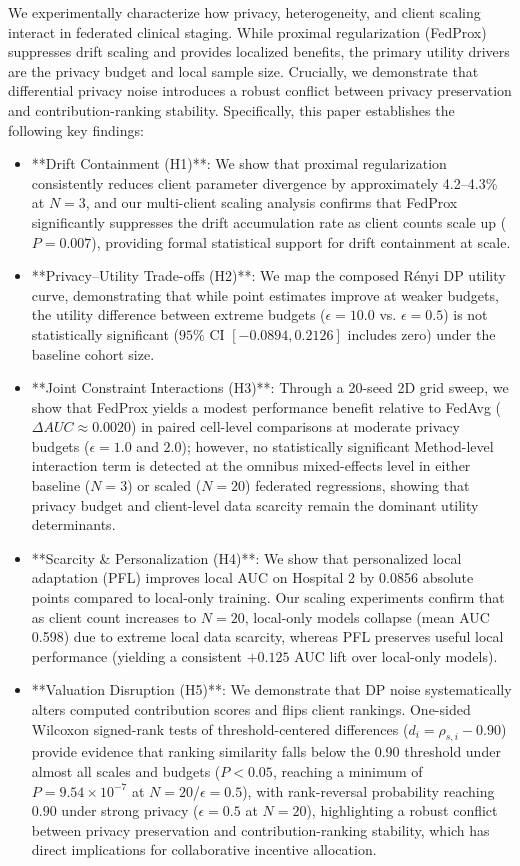 \documentclass[conference]{IEEEtran}
\begin{document}
We experimentally characterize how privacy, heterogeneity, and client scaling interact in federated clinical staging. While proximal regularization (FedProx) suppresses drift scaling and provides localized benefits, the primary utility drivers are the privacy budget and local sample size. Crucially, we demonstrate that differential privacy noise introduces a robust conflict between privacy preservation and contribution-ranking stability. Specifically, this paper establishes the following key findings:
\begin{itemize}
    \item **Drift Containment (H1)**: We show that proximal regularization consistently reduces client parameter divergence by approximately 4.2--4.3\% at $N=3$, and our multi-client scaling analysis confirms that FedProx significantly suppresses the drift accumulation rate as client counts scale up ($P=0.007$), providing formal statistical support for drift containment at scale.
    \item **Privacy--Utility Trade-offs (H2)**: We map the composed Rényi DP utility curve, demonstrating that while point estimates improve at weaker budgets, the utility difference between extreme budgets ($\epsilon=10.0$ vs. $\epsilon=0.5$) is not statistically significant ($95\%$ CI $[-0.0894, 0.2126]$ includes zero) under the baseline cohort size.
    \item **Joint Constraint Interactions (H3)**: Through a 20-seed 2D grid sweep, we show that FedProx yields a modest performance benefit relative to FedAvg ($\Delta AUC \approx 0.0020$) in paired cell-level comparisons at moderate privacy budgets ($\epsilon = 1.0$ and $2.0$); however, no statistically significant Method-level interaction term is detected at the omnibus mixed-effects level in either baseline ($N=3$) or scaled ($N=20$) federated regressions, showing that privacy budget and client-level data scarcity remain the dominant utility determinants.
    \item **Scarcity \& Personalization (H4)**: We show that personalized local adaptation (PFL) improves local AUC on Hospital 2 by 0.0856 absolute points compared to local-only training. Our scaling experiments confirm that as client count increases to $N=20$, local-only models collapse (mean AUC 0.598) due to extreme local data scarcity, whereas PFL preserves useful local performance (yielding a consistent $+0.125$ AUC lift over local-only models).
    \item **Valuation Disruption (H5)**: We demonstrate that DP noise systematically alters computed contribution scores and flips client rankings. One-sided Wilcoxon signed-rank tests of threshold-centered differences ($d_i = \rho_{s,i} - 0.90$) provide evidence that ranking similarity falls below the 0.90 threshold under almost all scales and budgets ($P < 0.05$, reaching a minimum of $P = 9.54 \times 10^{-7}$ at $N=20$/$\epsilon=0.5$), with rank-reversal probability reaching $0.90$ under strong privacy ($\epsilon=0.5$ at $N=20$), highlighting a robust conflict between privacy preservation and contribution-ranking stability, which has direct implications for collaborative incentive allocation.

\end{itemize}
\end{document}
